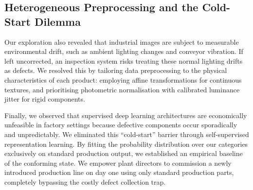 \subsection{Heterogeneous Preprocessing and the Cold-Start Dilemma}

Our exploration also revealed that industrial images are subject to measurable environmental drift, such as ambient lighting changes and conveyor vibration. If left uncorrected, an inspection system risks treating these normal lighting drifts as defects. We resolved this by tailoring data preprocessing to the physical characteristics of each product: employing affine transformations for continuous textures, and prioritising photometric normalisation with calibrated luminance jitter for rigid components.

Finally, we observed that supervised deep learning architectures are economically unfeasible in factory settings because defective components occur sporadically and unpredictably. We eliminated this ``cold-start'' barrier through self-supervised representation learning. By fitting the probability distribution over our categories exclusively on standard production output, we established an empirical baseline of the conforming state. We empower plant directors to commission a newly introduced production line on day one using only standard production parts, completely bypassing the costly defect collection trap.
